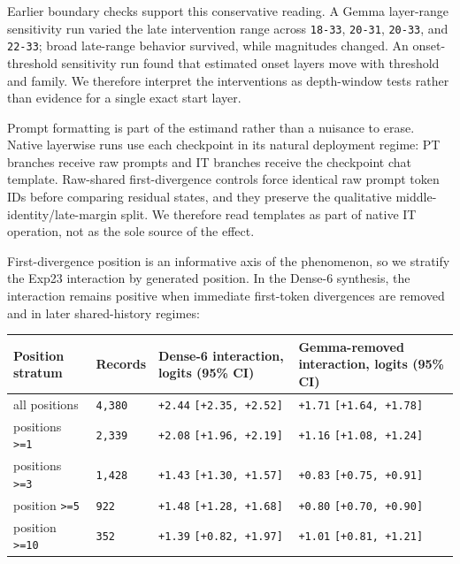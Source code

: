 \documentclass[11pt]{article}
\begin{document}
Earlier boundary checks support this conservative reading. A Gemma layer-range sensitivity run varied the late intervention range across \texttt{18-33}, \texttt{20-31}, \texttt{20-33}, and \texttt{22-33}; broad late-range behavior survived, while magnitudes changed. An onset-threshold sensitivity run found that estimated onset layers move with threshold and family. We therefore interpret the interventions as depth-window tests rather than evidence for a single exact start layer.

Prompt formatting is part of the estimand rather than a nuisance to erase. Native layerwise runs use each checkpoint in its natural deployment regime: PT branches receive raw prompts and IT branches receive the checkpoint chat template. Raw-shared first-divergence controls force identical raw prompt token IDs before comparing residual states, and they preserve the qualitative middle-identity/late-margin split. We therefore read templates as part of native IT operation, not as the sole source of the effect.

First-divergence position is an informative axis of the phenomenon, so we stratify the Exp23 interaction by generated position. In the Dense-6 synthesis, the interaction remains positive when immediate first-token divergences are removed and in later shared-history regimes:

\begin{table}[t]
\centering
\small
\setlength{\tabcolsep}{3pt}
\begin{tabularx}{\linewidth}{@{}>{\raggedright\arraybackslash}X >{\raggedright\arraybackslash}X >{\raggedright\arraybackslash}X >{\raggedright\arraybackslash}X@{}}
\toprule
Position stratum & Records & Dense-6 interaction, logits (95\% CI) & Gemma-removed interaction, logits (95\% CI) \\
\midrule
all positions & \texttt{4,380} & \texttt{+2.44} \texttt{[+2.35, +2.52]} & \texttt{+1.71} \texttt{[+1.64, +1.78]} \\
positions \texttt{>=1} & \texttt{2,339} & \texttt{+2.08} \texttt{[+1.96, +2.19]} & \texttt{+1.16} \texttt{[+1.08, +1.24]} \\
positions \texttt{>=3} & \texttt{1,428} & \texttt{+1.43} \texttt{[+1.30, +1.57]} & \texttt{+0.83} \texttt{[+0.75, +0.91]} \\
position \texttt{>=5} & \texttt{922} & \texttt{+1.48} \texttt{[+1.28, +1.68]} & \texttt{+0.80} \texttt{[+0.70, +0.90]} \\
position \texttt{>=10} & \texttt{352} & \texttt{+1.39} \texttt{[+0.82, +1.97]} & \texttt{+1.01} \texttt{[+0.81, +1.21]} \\
\bottomrule
\end{tabularx}
\end{table}
\end{document}

